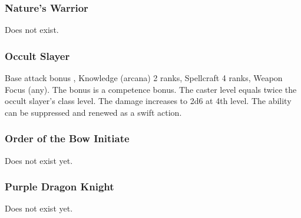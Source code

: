 \subsubsection{Nature's Warrior}
Does not exist.

\subsubsection{Occult Slayer}
 Base attack bonus , Knowledge (arcana) 2 ranks, Spellcraft 4 ranks, Weapon Focus (any).
 The bonus is a competence bonus.
 The caster level equals twice the occult slayer's class level.
 The damage increases to 2d6 at 4th level.
 The ability can be suppressed and renewed as a swift action.

\subsubsection{Order of the Bow Initiate}
Does not exist yet.

\subsubsection{Purple Dragon Knight}
Does not exist yet.

